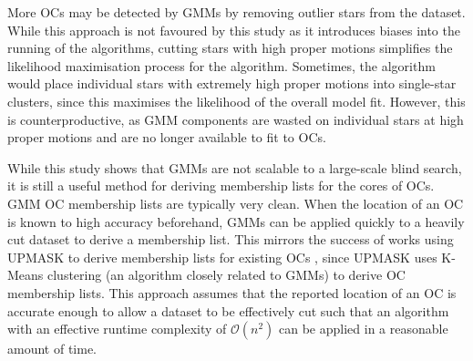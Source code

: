 More OCs may be detected by GMMs by removing outlier stars from the dataset. While this approach is not favoured by this study as it introduces biases into the running of the algorithms, cutting stars with high proper motions \citep[such as in][]{cantat-gaudin_gaia_2019} simplifies the likelihood maximisation process for the algorithm. Sometimes, the algorithm would place individual stars with extremely high proper motions into single-star clusters, since this maximises the likelihood of the overall model fit. However, this is counterproductive, as GMM components are wasted on individual stars at high proper motions and are no longer available to fit to OCs.

While this study shows that GMMs are not scalable to a large-scale blind search, it is still a useful method for deriving membership lists for the cores of OCs. GMM OC membership lists are typically very clean. When the location of an OC is known to high accuracy beforehand, GMMs can be applied quickly to a heavily cut dataset to derive a membership list. This mirrors the success of works using UPMASK to derive membership lists for existing OCs \citep[such as][]{cantat-gaudin_gaia_2018, cantat-gaudin_clusters_2020}, since UPMASK uses K-Means clustering (an algorithm closely related to GMMs) to derive OC membership lists. This approach assumes that the reported location of an OC is accurate enough to allow a dataset to be effectively cut such that an algorithm with an effective runtime complexity of $\mathcal{O}(n^2)$ can be applied in a reasonable amount of time.

\section{}\label{c2:sec:new_ocs}

